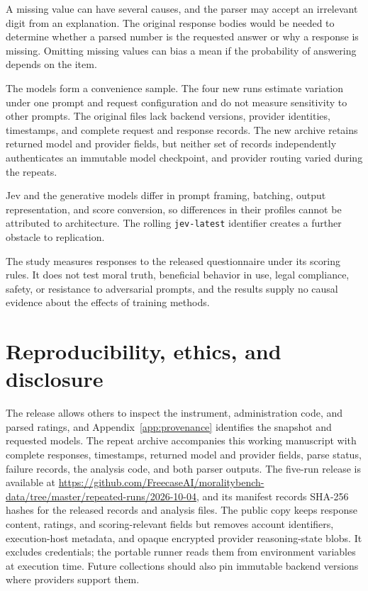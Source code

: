 \documentclass[11pt]{article}
\begin{document}
A missing value can have several causes, and the parser may accept an irrelevant digit from an explanation. The original response bodies would be needed to determine whether a parsed number is the requested answer or why a response is missing. Omitting missing values can bias a mean if the probability of answering depends on the item.

The models form a convenience sample. The four new runs estimate variation under one prompt and request configuration and do not measure sensitivity to other prompts. The original files lack backend versions, provider identities, timestamps, and complete request and response records. The new archive retains returned model and provider fields, but neither set of records independently authenticates an immutable model checkpoint, and provider routing varied during the repeats.

Jev and the generative models differ in prompt framing, batching, output representation, and score conversion, so differences in their profiles cannot be attributed to architecture. The rolling \texttt{jev-latest} identifier creates a further obstacle to replication.

The study measures responses to the released questionnaire under its scoring rules. It does not test moral truth, beneficial behavior in use, legal compliance, safety, or resistance to adversarial prompts, and the results supply no causal evidence about the effects of training methods.

\section{Reproducibility, ethics, and disclosure}
The release allows others to inspect the instrument, administration code, and parsed ratings, and Appendix~\ref{app:provenance} identifies the snapshot and requested models. The repeat archive accompanies this working manuscript with complete responses, timestamps, returned model and provider fields, parse status, failure records, the analysis code, and both parser outputs. The five-run release is available at \url{https://github.com/FreecaseAI/moralitybench-data/tree/master/repeated-runs/2026-10-04}, and its manifest records SHA-256 hashes for the released records and analysis files. The public copy keeps response content, ratings, and scoring-relevant fields but removes account identifiers, execution-host metadata, and opaque encrypted provider reasoning-state blobs. It excludes credentials; the portable runner reads them from environment variables at execution time. Future collections should also pin immutable backend versions where providers support them.
\end{document}
